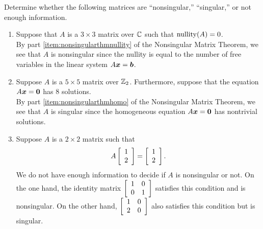 \begin{Exam} Determine whether the following matrices are ``nonsingular,'' ``singular,'' or not enough information.
\begin{enumerate}
\item Suppose that $A$ is a $3\times 3$ matrix over $\C$ such that $\nullity(A)=0$.\\

By part \ref{item:nonsingularthmnullity} of the Nonsingular Matrix Theorem, we see that $A$ is nonsingular since the nullity is equal to the number of free variables in the linear system $A\bb x=\bb b$.\\

\item Suppose $A$ is a $5\times 5$ matrix over $\Z_2$. Furthermore, suppose that the equation $A\bb x = \bb 0$ has 8 solutions.\\

By part \ref{item:nonsingularthmhomo} of the Nonsingular Matrix Theorem, we see that $A$ is singular since the homogeneous equation $A\bb x=\bb0$ has nontrivial solutions.\\

\item Suppose $A$ is a $2\times 2$ matrix such that 
\[A\vr{1\\2} = \vr{1\\2}.\] 
We do not have enough information to decide if $A$ is nonsingular or not. On the one hand, the identity matrix $\mtx{cc}{1&0\\0&1}$ satisfies this condition and is nonsingular. On the other hand, $\mtx{rr}{1&0\\2&0}$ also satisfies this condition but is singular.
\end{enumerate}
\end{Exam}\vs




